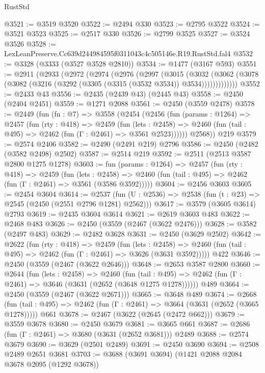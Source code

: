 \begin{lexlean}{RustStd}
\begin{coremodule}
@3521 := @3519 @3520
@3522 := @2494 @330
@3523 := @2795 @3522
@3524 := @3521 @3523
@3525 := @2517 @330
@3526 := @2799 @3525
@3527 := @3524 @3526
@3528 := LexLeanPreserve.Cc639d244984595f0311043c4c505146e.R19.RustStd.fal4
@3532 := @3328 (@3333 (@3527 @3528 @2810))
@3534 := @1477 (@3167 @593)
@3551 := @2911
    (@2933
      (@2972
        (@2974
          (@2976
            (@2997
              (@3015
                (@3032
                  (@3062 (@3078 (@3082 (@3216 (@3292 (@3305 (@3315 (@3532 @3534)) @3534)))))))))))))
@3552 := @2433 @43
@3556 := @2435 (@2439 @43) (@2445 @43)
@3558 := @2450 (@2404 @2451)
@3559 := @1271 @2088
@3561 := @2450 (@3559 @2478)
@3578 := @2449
    (fun (fn : @7) =>
    @3558
      (@2454
        (@2456
          (fun (params : @1264) =>
          @2457
            (fun (rty : @418) =>
            @2459
              (fun (lets : @2458) =>
              @2460 (fun (tail : @495) => @2462 (fun (Γ : @2461) => @3561 @2523))))))
        @2568))
    @219
@3579 := @2574 @2406
@3582 := @2490 (@2491 @219) @2796
@3586 := @2450 (@2482 (@3582 @2498) @2502)
@3587 := @2514 @219
@3592 := @2511 (@2513 @3587 @2800 @1275 @1278)
@3603 := fun (params : @1264) =>
  @2457
    (fun (rty : @418) =>
    @2459
      (fun (lets : @2458) =>
      @2460 (fun (tail : @495) => @2462 (fun (Γ : @2461) => @3561 (@3586 @3592)))))
@3604 := @2456 @3603
@3605 := @2454 @3604
@3614 := @2537 (fun (U : @2536) => @2538 (fun (t : @23) => @2545 (@2450 (@2551 @2796 @1281) @2562)))
@3617 := @3579 (@3605 @3614) @2793
@3619 := @2435 @3604 @3614
@3621 := @2619 @3603 @483
@3622 := @2468 @483
@3626 := @2450 (@3559 (@2467 (@3622 @2476)))
@3628 := @3582 (@2497 @483)
@3629 := @2482 @3628
@3631 := @2450 (@3629 @2502)
@3642 := @2622
    (fun (rty : @418) =>
    @2459
      (fun (lets : @2458) =>
      @2460 (fun (tail : @495) => @2462 (fun (Γ : @2461) => @3626 (@3631 @3592)))))
    @422
@3646 := @2450 (@3559 (@2467 (@3622 @2646)))
@3648 := @2653 @3587 @2800
@3660 := @2644
    (fun (lets : @2458) =>
    @2460
      (fun (tail : @495) => @2462 (fun (Γ : @2461) => @3646 (@3631 (@2652 (@3648 @1275 @1278))))))
    @489
@3664 := @2450 (@3559 (@2467 (@3622 @2671)))
@3665 := @3648 @489
@3674 := @2668
    (fun (tail : @495) => @2462 (fun (Γ : @2461) => @3664 (@3631 (@2652 (@3665 @1278)))))
    @661
@3678 := @2467 (@3622 (@2645 (@2472 @662)))
@3679 := @3559 @3678
@3680 := @2450 @3679
@3681 := @3665 @661
@3687 := @2686 (fun (Γ : @2461) => @3680 (@3631 (@2652 @3681))) @2489
@3688 := @2574 @3679
@3690 := @3629 (@2501 @2489)
@3691 := @2450 @3690
@3694 := @2508 @2489 @2651 @3681
@3703 := @3688 (@3691 @3694) (@1421 @2088 @2084 @3678 @2095 (@1292 @3678))

\end{coremodule}
\end{lexlean}

